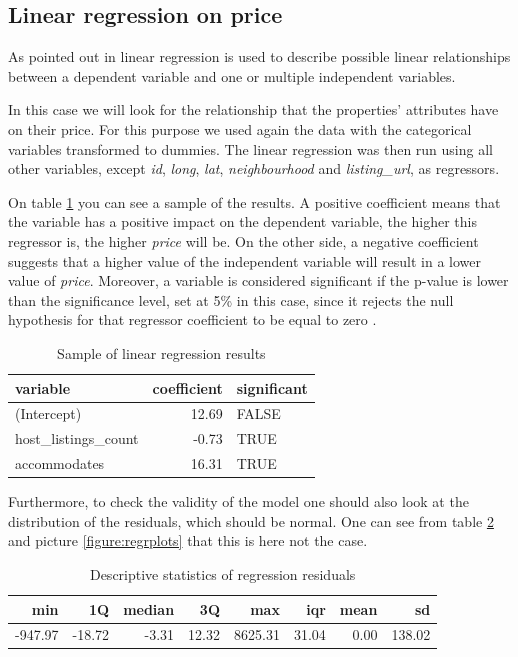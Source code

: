 \subsection{Linear regression on price}\label{subsec:lm}

As pointed out in \cite{wang2017price} linear regression is used to describe possible linear relationships between a dependent variable and one or multiple independent variables.

In this case we will look for the relationship that the properties' attributes have on their price. For this purpose we used again the data with the categorical variables transformed to dummies. The linear regression was then run using all other variables, except \textit{id}, \textit{long}, \textit{lat}, \textit{neighbourhood} and \textit{listing\_url}, as regressors.

On table \ref{table:lmresults} you can see a sample of the results. A positive coefficient means that the variable has a positive impact on the dependent variable, the higher this regressor is, the higher \textit{price} will be. On the other side, a negative coefficient suggests that a higher value of the independent variable will result in a lower value of \textit{price}. Moreover, a variable is considered significant if the p-value is lower than the significance level, set at 5\% in this case, since it rejects the null hypothesis for that regressor coefficient to be equal to zero \citep{moye2006statistical}.

\begin{table}[H]
\centering
\begin{tabular}{lrl}
  \hline
variable & coefficient & significant \\ 
  \hline
(Intercept) & 12.69 & FALSE \\ 
  host\_listings\_count & -0.73 & TRUE \\ 
  accommodates & 16.31 & TRUE \\ 
   \hline
\end{tabular}
\caption{Sample of linear regression results}
\label{table:lmresults}
\end{table}

Furthermore, to check the validity of the model one should also look at the distribution of the residuals, which should be normal. One can see from table \ref{table:lmresidualst} and picture \ref{figure:regrplots} that this is here not the case.

\begin{table}[H]
\centering
\begin{tabular}{rrrrrrrr}
  \hline
min & 1Q & median & 3Q & max & iqr & mean & sd \\ 
  \hline
-947.97 & -18.72 & -3.31 & 12.32 & 8625.31 & 31.04 & 0.00 & 138.02 \\ 
   \hline
\end{tabular}
\caption{Descriptive statistics of regression residuals}
\label{table:lmresidualst}
\end{table}

